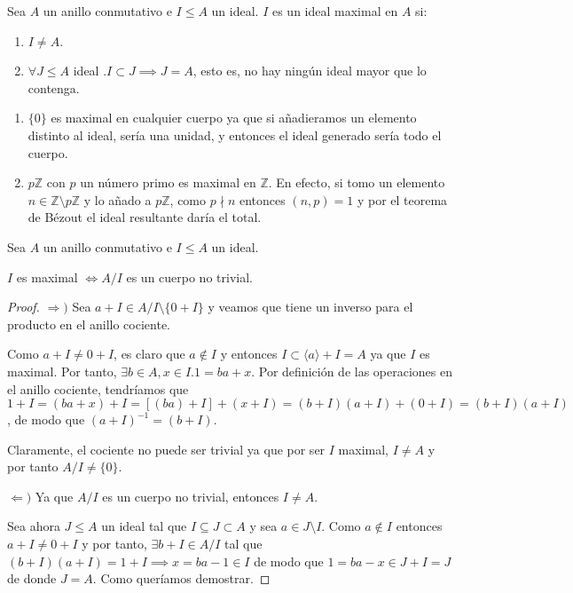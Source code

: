 \begin{definition}
Sea $A$ un anillo conmutativo e $I \le A$ un ideal. $I$ es un ideal maximal en $A$ si:

\begin{enumerate}
\item $I \neq A$. 
\item $\forall J \le A$ ideal $. I \subset J \implies J = A$, esto es, no hay ningún ideal mayor que lo contenga.
\end{enumerate}
\end{definition}

\begin{example}
\begin{enumerate}
\item $\{0\}$ es maximal en cualquier cuerpo ya que si añadieramos un elemento distinto al ideal, sería una unidad, y entonces el ideal generado sería todo el cuerpo.

\item $p\mathbb{Z}$ con $p$ un número primo es maximal en $\mathbb{Z}$. En efecto, si tomo un elemento $n \in \mathbb{Z} \setminus p\mathbb{Z}$ y lo añado a $p\mathbb{Z}$, como $p \nmid n$ entonces $(n,p) = 1$ y por el teorema de Bézout el ideal resultante daría el total. 
\end{enumerate}
\end{example}

\begin{proposition}
Sea $A$ un anillo conmutativo e $I \le A$ un ideal.

$I$ es maximal $\iff A/I$ es un cuerpo no trivial. 
\end{proposition}
\begin{proof}
$\Rightarrow)$ Sea $a+I \in A/I \setminus \{0+I\}$ y veamos que tiene un inverso para el producto en el anillo cociente. 

Como $a+I \neq 0+I$, es claro que $a \notin I$ y entonces $I \subset \langle a \rangle + I = A$ ya que $I$ es maximal. Por tanto, $\exists b \in A,x \in I.1 = ba+x$. Por definición de las operaciones en el anillo cociente, tendríamos que $1 + I = (ba+x) + I = [(ba)+I] + (x+I) = (b+I)(a+I) + (0+I) = (b+I)(a+I)$, de modo que $(a+I)^{-1} = (b+I)$.

Claramente, el cociente no puede ser trivial ya que por ser $I$ maximal, $I \neq A$ y por tanto $A/I \neq \{0\}$.

$\Leftarrow)$ Ya que $A/I$ es un cuerpo no trivial, entonces $I \neq A$. 

Sea ahora $J \le A$ un ideal tal que $I \subseteq J \subset A$ y sea $a \in J \setminus I$. Como $a \notin I$ entonces $a + I \neq 0 + I$ y por tanto, $\exists b+I \in A/I$ tal que $(b+I)(a+I) = 1+I \implies x = ba - 1 \in I$ de modo que $1 = ba-x \in J+I = J$ de donde $J = A$. Como queríamos demostrar. 
\end{proof}

